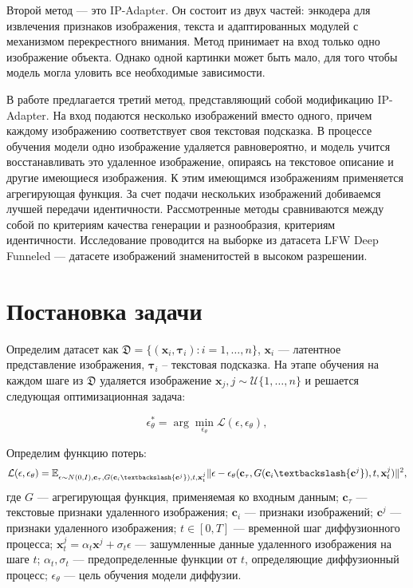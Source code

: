 \documentclass{article}
\begin{document}
Второй метод --- это IP-Adapter\cite{1}. Он состоит из двух частей: энкодера для извлечения признаков изображения, текста и адаптированных модулей с механизмом перекрестного внимания. Метод принимает на вход только одно изображение объекта. Однако одной картинки может быть мало, для того чтобы модель могла уловить все необходимые зависимости. 

В работе предлагается третий метод, представляющий собой модификацию IP-Adapter. На вход подаются несколько изображений вместо одного, причем каждому изображению соответствует своя текстовая подсказка. В процессе обучения модели одно изображение удаляется равновероятно, и модель учится восстанавливать это удаленное изображение, опираясь на текстовое описание и другие имеющиеся изображения. К этим имеющимся изображениям применяется агрегирующая функция. За счет подачи нескольких изображений добиваемся лучшей передачи идентичности. 
Рассмотренные методы сравниваются между собой по критериям качества генерации и разнообразия, критериям идентичности.
Исследование проводится на выборке из датасета LFW Deep Funneled --- датасете изображений знаменитостей в высоком разрешении. 

\section{Постановка задачи}

Определим датасет как $ \mathfrak{D}=\{ (\mathbf{x}_{i}, \mathbf{\tau}_{i}): i = 1, \dots, n\}$, $\mathbf{x}_{i}$ --- латентное представление изображения, $\mathbf{\tau}_{i}$ -- текстовая подсказка. На этапе обучения на каждом шаге из $\mathfrak{D}$ удаляется изображение $\mathbf{x}_{j}, j \sim \mathcal{U}\{1, \dots, n\}$ и решается следующая оптимизационная задача:

\begin{equation}
\epsilon_{\theta}^* = \arg \min_{\epsilon_{\theta}}\mathcal{L}(\epsilon, \epsilon_{\theta}),
\end{equation}

Определим функцию потерь: 
\begin{equation}
\mathcal{L}(\epsilon, \epsilon_{\theta}) = \mathbb{E}_{\epsilon \sim N(0, I),\mathbf{c}_{\tau}, G(\mathbf{c}_{i} \textbackslash \{\mathbf{c}^{j}\}), t, \mathbf{x}^{j}_{t}} \|\epsilon - \epsilon_{\theta}(\mathbf{c}_{\tau}, G(\mathbf{c}_{i} \textbackslash \{\mathbf{c}^{j}\}), t, \mathbf{x}^{j}_{t})\|^2,
\end{equation}
где $G$ --- агрегирующая функция, применяемая ко входным данным; $\mathbf{c}_{\tau}$ --- текстовые признаки удаленного изображения; $\mathbf{c}_{i}$ --- признаки изображений; $\mathbf{c}^{j}$ --- признаки удаленного изображения; $t \in [0, T]$ --- временной шаг диффузионного процесса; $\mathbf{x}^{j}_{t} = \alpha_t \mathbf{x}^{j}  + \sigma_t \epsilon$ --- зашумленные данные удаленного изображения на шаге $t$; $\alpha_t, \sigma_t$ --- предопределенные функции от $t$, определяющие диффузионный процесс; $\epsilon_{\theta}$ --- цель обучения модели диффузии.
\end{document}
